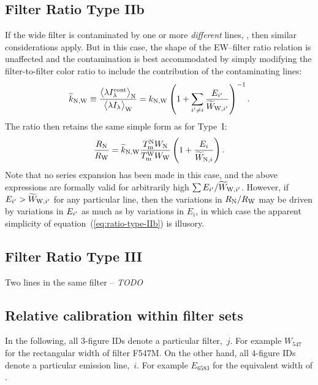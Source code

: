 \documentclass[preprint, 10pt]{aastex}
\begin{document}
\subsection{Filter Ratio Type IIb}
\label{sec:typeIIb}
If the wide filter is contaminated by one or more \emph{different} lines,
\Contam{}, then similar considerations apply.
But in this case, the shape of the
EW--filter ratio relation is unaffected and the contamination is best
accommodated by simply modifying the filter-to-filter color ratio to
include the contribution of the contaminating lines:
\begin{equation}
  \label{eq:color-correct-IIb}
  \widetilde{k}_{\mathrm{N}, \mathrm{W}} \equiv \frac{\bigl\langle \lambda I_\lambda^{\mathrm{cont}} \bigr\rangle_{\mathrm{N}}}{\bigl\langle \lambda I_\lambda \bigr\rangle_{\mathrm{W}}}
  = k_{\mathrm{N}, \mathrm{W}} 
  \left( 1 + \sum_{{i'} \ne i}\frac{E_{{i'}}}{\widetilde{W}_{\mathrm{W}, {i'}}} \right)^{-1}
  .
\end{equation}
The ratio then retains the same simple form as for Type~I: 
\begin{equation}
  \label{eq:ratio-type-IIb}
  \frac{R_{\mathrm{N}}}{R_{\mathrm{W}}} = 
  \widetilde{k}_{\mathrm{N}, \mathrm{W}} \frac{T_{\mathrm{m}}^{\mathrm{N}} W_{\mathrm{N}}}{T_{\mathrm{m}}^{\mathrm{W}} W_{\mathrm{W}}}
  \left(
    1 + \frac{E_i}{\widetilde{W}_{\mathrm{N}, i}}
  \right) .
\end{equation}
Note that no series expansion has been made in this case, and the
above expressions are formally valid for arbitrarily high \(\sum E_{{i'}}
/ \widetilde{W}_{\mathrm{W}, {i'}}\).  However, if \(E_{{i'}} >
\widetilde{W}_{\mathrm{W}, {i'}}\) for any particular line, 
then the variations in \(R_{\mathrm{N}} / R_{\mathrm{W}}\)
may be driven by variations in \(E_{{i'}}\) as much as by variations
in \(E_i\), in which case the apparent simplicity of
equation~(\ref{eq:ratio-type-IIb}) is illusory. 

\subsection{Filter Ratio Type III}
\label{sec:typeIII}

Two lines in the same filter -- \textit{TODO}

\subsection{Relative calibration within filter sets}
\label{sec:application}

In the following, all 3-figure IDs denote a particular filter,~\(j\). 
For example \(W_{547}\) for the rectangular width of filter
F547M.  
On the other hand, all 4-figure IDs denote a particular emission line,~\(i\). 
For example \(E_{6583}\) for the equivalent width of \nii{}
.
\end{document}
